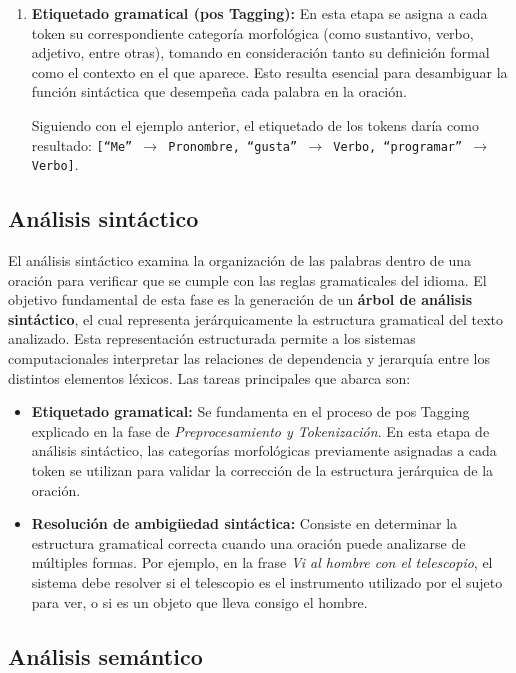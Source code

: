 \begin{enumerate}
      \item \textbf{Etiquetado gramatical (\gls{pos} Tagging):} En esta etapa se asigna a cada token su correspondiente categoría morfológica (como sustantivo, verbo, adjetivo, entre otras), tomando en consideración tanto su definición formal como el contexto en el que aparece. Esto resulta esencial para desambiguar la función sintáctica que desempeña cada palabra en la oración.

            Siguiendo con el ejemplo anterior, el etiquetado de los tokens daría como resultado: \texttt{[``Me'' $\rightarrow$ Pronombre, ``gusta'' $\rightarrow$ Verbo, ``programar'' $\rightarrow$ Verbo]}.
\end{enumerate}

\subsection{Análisis sintáctico}

El análisis sintáctico examina la organización de las palabras dentro de una oración para verificar que se cumple con las reglas gramaticales del idioma. El objetivo fundamental de esta fase es la generación de un \textbf{árbol de análisis sintáctico}, el cual representa jerárquicamente la estructura gramatical del texto analizado. Esta representación estructurada permite a los sistemas computacionales interpretar las relaciones de dependencia y jerarquía entre los distintos elementos léxicos. Las tareas principales que abarca son:

\begin{itemize}
      \item \textbf{Etiquetado gramatical:} Se fundamenta en el proceso de \gls{pos} Tagging explicado en la fase de \textit{Preprocesamiento y Tokenización}. En esta etapa de análisis sintáctico, las categorías morfológicas previamente asignadas a cada token se utilizan para validar la corrección de la estructura jerárquica de la oración.
      \item \textbf{Resolución de ambigüedad sintáctica:} Consiste en determinar la estructura gramatical correcta cuando una oración puede analizarse de múltiples formas. Por ejemplo, en la frase \textit{Vi al hombre con el telescopio}, el sistema debe resolver si el telescopio es el instrumento utilizado por el sujeto para ver, o si es un objeto que lleva consigo el hombre.
\end{itemize}

\subsection{Análisis semántico}

